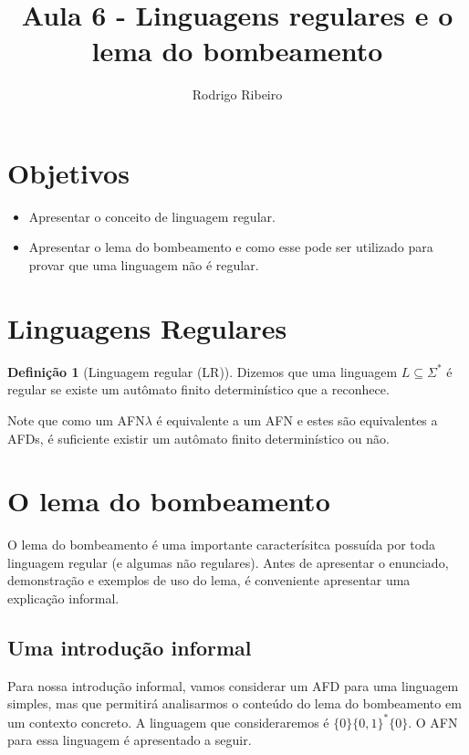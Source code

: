\documentclass[a4paper]{article}
\theoremstyle{definition}
\newtheorem{Definition}{Definição}
\begin{document}
  \title{Aula 6 - Linguagens regulares e o lema do bombeamento}
  \author{Rodrigo Ribeiro}

  \maketitle


  \pagestyle{fancy}


  \section*{Objetivos}

  \begin{itemize}
     \item Apresentar o conceito de linguagem regular.
     \item Apresentar o lema do bombeamento e como esse
       pode ser utilizado para provar que uma
      linguagem não é regular. 
  \end{itemize}

  \section{Linguagens Regulares}

  \begin{Definition}[Linguagem regular (LR)]\label{regular}
    Dizemos que uma linguagem $L \subseteq \Sigma^*$ é regular se
    existe um autômato finito determinístico que a reconhece.
  \end{Definition}

  Note que como um AFN$\lambda$ é equivalente a um AFN e estes são
  equivalentes a AFDs, é suficiente existir um autômato finito
  determinístico ou não.

  \section{O lema do bombeamento}

  O lema do bombeamento é uma importante caracterísitca possuída por
  toda linguagem regular (e algumas não regulares). Antes de apresentar
  o enunciado, demonstração e exemplos de uso do lema, é conveniente
  apresentar uma explicação informal.

  \subsection{Uma introdução informal}

  Para nossa introdução informal, vamos considerar um AFD para uma linguagem
  simples, mas que permitirá analisarmos o conteúdo do lema do bombeamento
  em um contexto concreto. A linguagem que consideraremos é $\{0\}\{0,1\}^*\{0\}$.
  O AFN para essa linguagem é apresentado a seguir.
\end{document}
